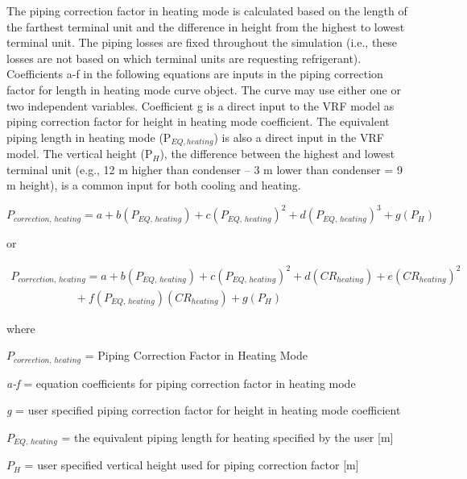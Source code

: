 The piping correction factor in heating mode is calculated based on the length of the farthest terminal unit and the difference in height from the highest to lowest terminal unit. The piping losses are fixed throughout the simulation (i.e., these losses are not based on which terminal units are requesting refrigerant). Coefficients a-f in the following equations are inputs in the piping correction factor for length in heating mode curve object. The curve may use either one or two independent variables. Coefficient g is a direct input to the VRF model as piping correction factor for height in heating mode coefficient. The equivalent piping length in heating mode (P\(_{EQ,heating}\)) is also a direct input in the VRF model. The vertical height (P\(_H\)), the difference between the highest and lowest terminal unit (e.g., 12 m higher than condenser – 3 m lower than condenser = 9 m height), is a common input for both cooling and heating.

\begin{equation}
  P_{correction,\,heating} = a + b \left( P_{EQ,\,heating} \right) + c \left( P_{EQ,\,heating} \right)^2 + d \left( P_{EQ,\,heating} \right)^3 + g \left( P_H \right)
\end{equation}

or

\begin{equation}
  \begin{array}{l}
  {P_{correction,\,heating}} = a + b \left( P_{EQ,\,heating} \right) + c \left( P_{EQ,\,heating} \right)^2 + d \left( CR_{heating} \right) + e \left( CR_{heating} \right)^2 \\
  \,\,\,\,\,\,\,\,\,\,\,\,\,\,\,\,\,\,\,\,\,\,\,\,\,\,\,\,\,\,\,\,\,\, + f \left( P_{EQ,\,heating} \right) \left( CR_{heating} \right) + g \left( P_H \right)
  \end{array}
\end{equation}

where

\(P_{correction,\,heating}\) = Piping Correction Factor in Heating Mode

\emph{a-f} = equation coefficients for piping correction factor in heating mode

\emph{g} = user specified piping correction factor for height in heating mode coefficient

\(P_{EQ,\,heating}\) = the equivalent piping length for heating specified by the user [m]

\(P_H\) = user specified vertical height used for piping correction factor [m]

